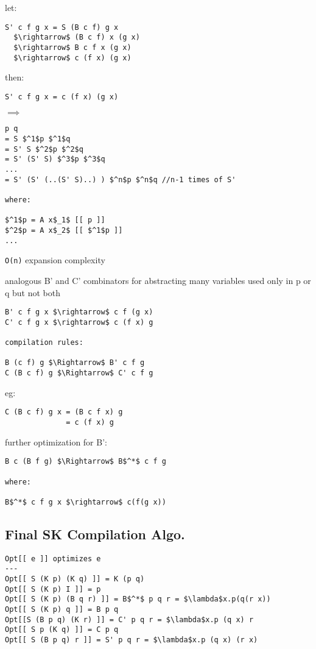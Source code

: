 \documentclass[8pt]{extarticle}
\begin{document}
\begin{multicols*}{2}
\begin{tblr}[]{}
let:
\begin{lstlisting}
S' c f g x = S (B c f) g x
  $\rightarrow$ (B c f) x (g x)
  $\rightarrow$ B c f x (g x)
  $\rightarrow$ c (f x) (g x)
\end{lstlisting}

then:

\verb|S' c f g x = c (f x) (g x)|

$\implies$

\begin{lstlisting}
p q
= S $^1$p $^1$q
= S' S $^2$p $^2$q
= S' (S' S) $^3$p $^3$q
...
= S' (S' (..(S' S)..) ) $^n$p $^n$q //n-1 times of S'

where:

$^1$p = A x$_1$ [[ p ]]
$^2$p = A x$_2$ [[ $^1$p ]]
...
\end{lstlisting}

\verb|O(n)| expansion complexity

analogous B' and C' combinators for abstracting many variables used only in p or q but not both

\begin{lstlisting}
B' c f g x $\rightarrow$ c f (g x)
C' c f g x $\rightarrow$ c (f x) g

compilation rules:

B (c f) g $\Rightarrow$ B' c f g
C (B c f) g $\Rightarrow$ C' c f g
\end{lstlisting}

eg:

\begin{lstlisting}
C (B c f) g x = (B c f x) g
              = c (f x) g  
\end{lstlisting}

further optimization for B':

\begin{lstlisting}
B c (B f g) $\Rightarrow$ B$^*$ c f g

where:

B$^*$ c f g x $\rightarrow$ c(f(g x))
\end{lstlisting}

\subsection{Final SK Compilation Algo.}
\begin{lstlisting}
Opt[[ e ]] optimizes e
---
Opt[[ S (K p) (K q) ]] = K (p q)
Opt[[ S (K p) I ]] = p
Opt[[ S (K p) (B q r) ]] = B$^*$ p q r = $\lambda$x.p(q(r x))
Opt[[ S (K p) q ]] = B p q
Opt[[S (B p q) (K r) ]] = C' p q r = $\lambda$x.p (q x) r
Opt[[ S p (K q) ]] = C p q
Opt[[ S (B p q) r ]] = S' p q r = $\lambda$x.p (q x) (r x)


\end{lstlisting}
\end{tblr}
\end{multicols*}
\end{document}
